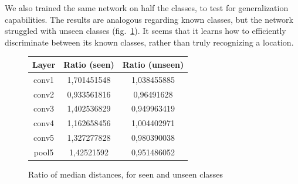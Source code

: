 We also trained the same network on half the classes, to test for generalization capabilities. The results are analogous regarding known classes, but the network struggled with unseen classes (fig.~\ref{halftrainvalues}). It seems that it learns how to efficiently discriminate between its known classes, rather than truly recognizing a location.

\begin{figure}[htb]
\centering
\begin{tabular}{|c|c|c|}
  \hline
   Layer & Ratio (seen) & Ratio (unseen) \\
  \hline
  conv1 & 1,701451548 & 1,038455885 \\
  conv2 & 0,933561816 & 0,96491628 \\
  conv3 & 1,402536829 & 0,949963419 \\
  conv4 & 1,162658456 & 1,004402971 \\
  conv5 & 1,327277828 & 0,980390038 \\
  pool5 & 1,42521592 & 0,951486052 \\
  \hline
\end{tabular}
\caption{Ratio of median distances, for seen and unseen classes}
\label{halftrainvalues}
\end{figure}